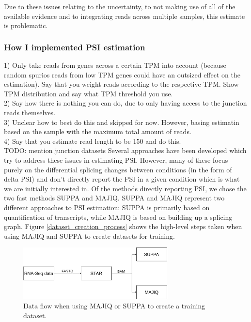 Due to these issues relating to the uncertainty, to not making use of all of the available evidence and to integrating reads across multiple samples, this estimate is problematic.
\subsubsection{How I implemented PSI estimation} \label{subsubsec:implementedpsiestimation}

1) Only take reads from genes across a certain TPM into account (because random spurios reads from low TPM genes could have an outsized effect on the estimation). Say that you weight reads according to the respective TPM. Show TPM distribution and say what TPM threshold you use.\\
2) Say how there is nothing you can do, due to only having access to the junction reads themselves. \\
3) Unclear how to best do this and skipped for now. However, basing estimatin based on the sample with the maximum total amount of reads. \\
4) Say that you estimate read length to be 150 and do this. \\
 TODO: mention junction datasets
Several approaches have been developed which try to address these issues in estimating PSI. However, many of these focus purely on the differential splicing changes between conditions (in the form of delta PSI) and don't directly report the PSI in a given condition which is what we are initially interested in. Of the methods directly reporting PSI, we chose the two fast methods SUPPA and MAJIQ. SUPPA and MAJIQ represent two different approaches to PSI estimation: SUPPA is primarily based on quantification of transcripts, while MAJIQ is based on building up a splicing graph. Figure \ref{dataset_creation_process} shows the high-level steps taken when using MAJIQ and SUPPA to create datasets for training.

\begin{figure}
	\centering\includegraphics[width=0.7\textwidth]{figures/d2v-Page-3.pdf} 
	\caption{Data flow when using MAJIQ or SUPPA to create a training dataset. }
	\label{fig:dataset_creation_process}
\end{figure}

